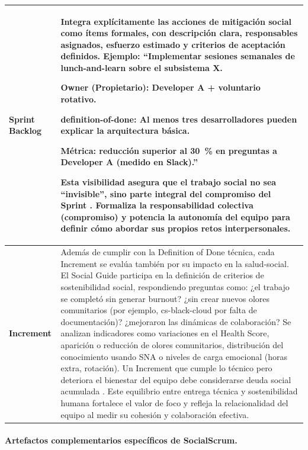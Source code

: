\begin{longtable}[H]{|
    >{\RaggedRight\hspace{0pt}}p{4.0cm}|   %
    >{\RaggedRight\hspace{0pt}}p{11.5cm}|  %
    }
    \textbf{Sprint Backlog}  &
    Integra explícitamente las acciones de mitigación social como ítems formales, con descripción clara, responsables asignados, esfuerzo estimado y criterios de aceptación definidos.
    Ejemplo: ``Implementar sesiones semanales de \gls{lunch-and-learn} sobre el subsistema X.

    Owner (Propietario): Developer A + voluntario rotativo.

    \gls{definition-of-done}: Al menos tres desarrolladores pueden explicar la arquitectura básica.

    Métrica: reducción superior al 30~\% en preguntas a Developer A (medido en Slack).''

    Esta visibilidad asegura que el trabajo social no sea ``invisible'', sino parte integral del compromiso del Sprint \cite{saeeda2024nontechnicaldebt}.
    Formaliza la responsabilidad colectiva (compromiso) y potencia la autonomía del equipo para definir cómo abordar sus propios retos interpersonales.                                                                                                           \\[1pt]
    \hline

    \textbf{Increment}       &
    Además de cumplir con la Definition of Done técnica, cada Increment se evalúa también por su impacto en la \gls{salud-social}.
    El Social Guide participa en la definición de criterios de sostenibilidad social, respondiendo preguntas como: ¿el trabajo se completó sin generar burnout? ¿sin crear nuevos olores comunitarios (por ejemplo, \gls{cs-black-cloud} por falta de documentación)? ¿mejoraron las dinámicas de colaboración?
    Se analizan indicadores como variaciones en el Health Score, aparición o reducción de olores comunitarios, distribución del conocimiento usando SNA o niveles de carga emocional (horas extra, rotación).
    Un Increment que cumple lo técnico pero deteriora el bienestar del equipo debe considerarse deuda social acumulada \cite{saeeda2024nontechnicaldebt}.
    Este equilibrio entre entrega técnica y sostenibilidad humana fortalece el valor de foco y refleja la relacionalidad del equipo al medir su cohesión y colaboración efectiva.                                                                                 \\
\end{longtable}
\endgroup

\paragraph{Artefactos complementarios específicos de SocialScrum.}

